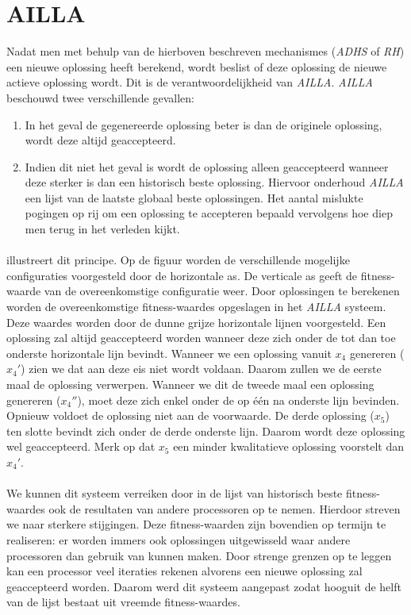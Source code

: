 \section{AILLA}
Nadat men met behulp van de hierboven beschreven mechanismes (\emph{ADHS} of \emph{RH}) een nieuwe oplossing heeft berekend, wordt beslist of deze oplossing de nieuwe actieve oplossing wordt. Dit is de verantwoordelijkheid van \emph{AILLA}. \emph{AILLA} beschouwd twee verschillende gevallen:
\begin{enumerate}
 \item In het geval de gegenereerde oplossing beter is dan de originele oplossing, wordt deze altijd geaccepteerd.
 \item Indien dit niet het geval is wordt de oplossing alleen geaccepteerd wanneer deze sterker is dan een historisch beste oplossing. Hiervoor onderhoud \emph{AILLA} een lijst van de laatste globaal beste oplossingen. Het aantal mislukte pogingen op rij om een oplossing te accepteren bepaald vervolgens hoe diep men terug in het verleden kijkt.
\end{enumerate}

\paragraph{}
 illustreert dit principe. Op de figuur worden de verschillende mogelijke configuraties voorgesteld door de horizontale as. De verticale as geeft de fitness-waarde van de overeenkomstige configuratie weer. Door oplossingen te berekenen worden de overeenkomstige fitness-waardes opgeslagen in het \emph{AILLA} systeem. Deze waardes worden door de dunne grijze horizontale lijnen voorgesteld. Een oplossing zal altijd geaccepteerd worden wanneer deze zich onder de tot dan toe onderste horizontale lijn bevindt. Wanneer we een oplossing vanuit $x_4$ genereren ($x_4'$) zien we dat aan deze eis niet wordt voldaan. Daarom zullen we de eerste maal de oplossing verwerpen. Wanneer we dit de tweede maal een oplossing genereren ($x_4''$), moet deze zich enkel onder de op \'e\'en na onderste lijn bevinden. Opnieuw voldoet de oplossing niet aan de voorwaarde. De derde oplossing ($x_5$) ten slotte bevindt zich onder de derde onderste lijn. Daarom wordt deze oplossing wel geaccepteerd. Merk op dat $x_5$ een minder kwalitatieve oplossing voorstelt dan $x_4'$.

\paragraph{}
We kunnen dit systeem verreiken door in de lijst van historisch beste fitness-waardes ook de resultaten van andere processoren op te nemen. Hierdoor streven we naar sterkere stijgingen. Deze fitness-waarden zijn bovendien op termijn te realiseren: er worden immers ook oplossingen uitgewisseld waar andere processoren dan gebruik van kunnen maken. Door strenge grenzen op te leggen kan een processor veel iteraties rekenen alvorens een nieuwe oplossing zal geaccepteerd worden. Daarom werd dit systeem aangepast zodat hooguit de helft van de lijst bestaat uit vreemde fitness-waardes.